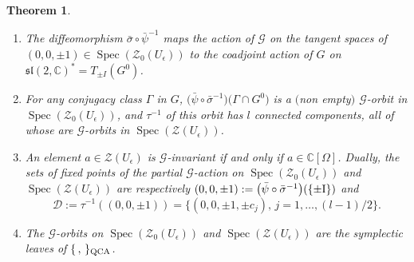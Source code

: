 \documentclass[pdftex]{sigma}%
\numberwithin{equation}{section}
\numberwithin{figure}{section}
\newtheorem{teo}{Theorem}[section]
\newcommand{\Ue}{U_\epsilon}
\newcommand{\mc}{\mathbb{C}}
\newcommand{\Gg}{{\mathcal G}}
\begin{document}
\begin{teo}\label{QCAteo}\qquad

\begin{enumerate}\itemsep=0pt
\item[$(a)$] The diffeomorphism $\bar \sigma \circ \bar \psi^{-1}$ maps the action of $\Gg$ on the tangent spaces of $(0,0,\pm 1)\in \operatorname{Spec}(\mathcal{Z}_0(U_\epsilon))$ to the coadjoint action of $G$ on ${\mathfrak{sl}}(2,\mc)^* = T_{\pm I}(G^0)$.

\item[$(b)$] For any conjugacy class $\Gamma$ in $G$, $\big(\bar \psi\circ \bar \sigma^{-1}\big)\big(\Gamma \cap G^0\big)$ is a $($non empty$)$ $\Gg$-orbit in $\operatorname{Spec}(\mathcal{Z}_0(U_\epsilon))$, and $\tau^{-1}$ of this orbit has $l$ connected components, all of whose are $\Gg$-orbits in $\operatorname{Spec}(\mathcal{Z}(U_\epsilon))$.

\item[$(c)$] An element $a\in {\mathcal{Z}}(\Ue)$ is $\mathcal{G}$-invariant if and only if $a\in \mc[\Omega]$. Dually, the sets of fixed points of the partial $\Gg$-action on $\operatorname{Spec}(\mathcal{Z}_0(U_\epsilon))$ and $\operatorname{Spec}(\mathcal{Z}(U_\epsilon))$ are respectively $(0,0,\pm 1):= \big(\bar \psi \circ \bar \sigma^{-1}\big)(\{{\rm \pm I}\})$ and
\[
\mathcal{D} := \tau^{-1}((0,0,\pm 1)) = \{(0,0,\pm 1,\pm c_j), \, j=1,\dots,(l-1)/2\}.
\]

\item[$(d)$] The $\Gg$-orbits on $\operatorname{Spec}(\mathcal{Z}_0(U_\epsilon))$ and $\operatorname{Spec}(\mathcal{Z}(U_\epsilon))$ are the symplectic leaves of $\{\, ,\, \}_{\rm QCA}$.

 \end{enumerate}
\end{teo}
\end{document}
